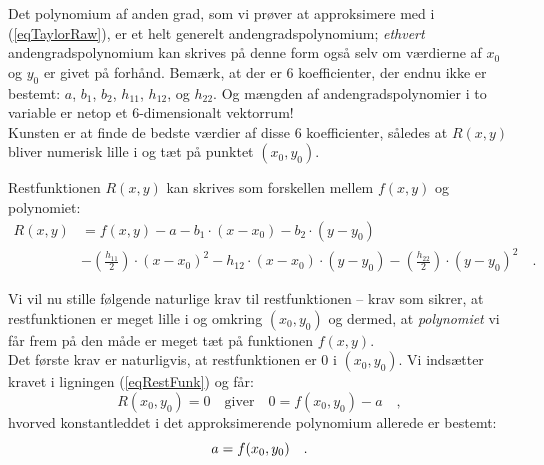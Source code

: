 \begin{think}
Det polynomium af anden grad, som vi prøver at approksimere med i (\ref{eqTaylorRaw}), er et helt generelt andengradspolynomium; {\textit{ethvert}} andengradspolynomium kan skrives på denne form også selv om værdierne af $x_{0}$ og $y_{0}$ er givet på forhånd. Bemærk, at der er $6$ koefficienter, der endnu ikke er bestemt: $a$, $b_{1}$, $b_{2}$, $h_{11}$, $h_{12}$, og $h_{22}$. Og mængden af andengradspolynomier i to variable er netop et $6$-dimensionalt vektorrum! \\

Kunsten er at finde de bedste værdier af disse  $6$ koefficienter, således at $R(x,y)$ bliver numerisk lille i og tæt på punktet $(x_{0}, y_{0})$.
\end{think}

Restfunktionen $R(x,y)$ kan skrives som forskellen mellem $f(x,y)$ og polynomiet:
\begin{equation} \label{eqRestFunk}
\begin{aligned}
R(x,y) &= f(x,y) - a - b_{1}\cdot (x-x_{0}) - b_{2}\cdot (y-y_{0}) \\
&- \left(\frac{h_{11}}{2}\right)\cdot (x-x_{0})^{2} -  h_{12}\cdot (x-x_{0})\cdot (y-y_{0}) - \left(\frac{h_{22}}{2}\right)\cdot (y-y_{0})^{2} \quad.
\end{aligned}
\end{equation}

Vi vil nu stille følgende naturlige krav til restfunktionen --  krav som sikrer, at restfunktionen  er meget lille i og omkring $(x_{0}, y_{0})$ og dermed, at {\textit{polynomiet}} vi får frem på den måde er meget tæt på funktionen $f(x,y)$.\\

Det første krav er naturligvis, at restfunktionen er $0$ i $(x_{0}, y_{0})$.
Vi indsætter kravet i ligningen (\ref{eqRestFunk}) og får:
\begin{equation}
R(x_{0}, y_{0}) = 0 \quad \textrm{giver} \quad 0 = f(x_{0}, y_{0}) - a \quad,
\end{equation}
hvorved konstantleddet i det approksimerende polynomium allerede er bestemt:
\begin{equation}
a = f(x_{0}, y_{0}) \quad .\\
\end{equation}

